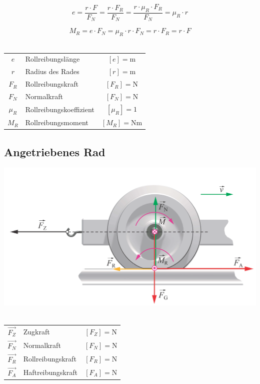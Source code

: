 		$$ \boxed{ e = \frac{r \cdot F}{F_N} = \frac{r \cdot F_R}{F_N} =  \frac{r \cdot \mu_R \cdot F_R}{F_N} = \mu_R \cdot r }$$ 
		
		$$ \boxed{ M_R = e \cdot F_N = \mu_R \cdot r \cdot F_N = r \cdot F_R = r \cdot F} $$ \\

		\begin{tabular}{c l c}
			$e$ & Rollreibungslänge & $[e] = \mathrm{m}$ \\
			$r$ & Radius des Rades & $[r] = \mathrm{m}$ \\
			$F_R$ & Rollreibungskraft & $[F_R] = \mathrm{N}$ \\
			$F_N$ & Normalkraft & $[F_N] = \mathrm{N}$ \\
			$\mu_R$ & Rollreibungskoeffizient & $[\mu_R] = 1$ \\
			$M_R$ & Rollreibungsmoment & $[M_R] = \mathrm{Nm}$ \\
		\end{tabular}

	\subsection{Angetriebenes Rad}
	
		\includegraphics[width=0.8\linewidth]{Bilder/antriebsrad} \\
		\\

		\begin{tabular}{c l c}
			$\vec{F_Z}$ & Zugkraft & $[F_Z] = \mathrm{N}$ \\
			$\vec{F_N}$ & Normalkraft & $[F_N] = \mathrm{N}$ \\
			$\vec{F_R}$ & Rollreibungskraft & $[F_R] = \mathrm{N}$ \\
			$\vec{F_A}$ & Haftreibungskraft & $[F_A] = \mathrm{N}$ \\
		\end{tabular}

